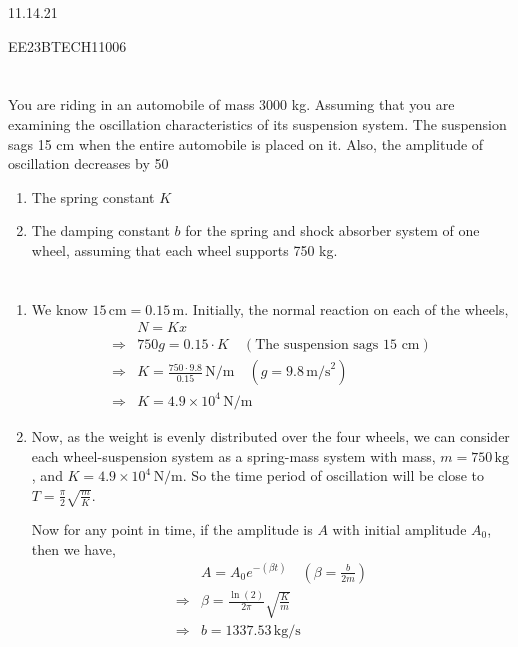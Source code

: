 \documentclass{article}
\begin{document}
\begin{center}
\Large{11.14.21}

\normalsize{EE23BTECH11006}
\end{center}



\section*{}
You are riding in an automobile of mass 3000 kg. Assuming that you are examining the oscillation characteristics of its suspension system. The suspension sags 15 cm when the entire automobile is placed on it. Also, the amplitude of oscillation decreases by 50%
\begin{enumerate}[label=(\alph*)]
    \item The spring constant \( K \)
    \item The damping constant \( b \) for the spring and shock absorber system of one wheel, assuming that each wheel supports 750 kg.
\end{enumerate}

\section*{}

\begin{enumerate}[label=\textbf{Part-\alph*:}]
    \item We know \(15\, \text{cm} = 0.15\, \text{m}\). Initially, the normal reaction on each of the wheels,
    \begin{align}
&N = Kx \\
\Rightarrow &750g = 0.15 \cdot K \quad (\text{The suspension sags 15 cm})\\
\Rightarrow &K = \frac{750 \cdot 9.8}{0.15}\, \text{N/m} \quad (g = 9.8\, \text{m/s}^2) \\
\Rightarrow &K = 4.9 \times 10^4\, \text{N/m}        
    \end{align}
    

    \item Now, as the weight is evenly distributed over the four wheels, we can consider each wheel-suspension system as a spring-mass system with mass, \(m = 750\, \text{kg}\), and \(K = 4.9 \times 10^4\, \text{N/m}\). So the time period of oscillation will be close to \(T = \frac{\pi}{2} \sqrt{\frac{m}{K}}\).

    Now for any point in time, if the amplitude is \(A\) with initial amplitude \(A_{\text{0}}\), then we have,
    \begin{align}
&A = A_{\text{0}}e^{-(\beta t)} \quad (\beta = \frac{b}{2m}) \\
\Rightarrow &\beta = \frac{\ln(2)}{2\pi} \sqrt{\frac{K}{m}} \quad \\
\Rightarrow &b = 1337.53\, \text{kg/s} 
    \end{align}
\end{enumerate}
\end{document}
